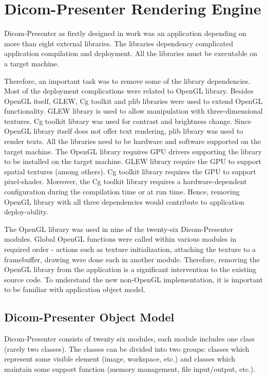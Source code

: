 \chapter{Dicom-Presenter Rendering Engine}
\label{noOpenGL}
\vspace{-10mm}
Dicom-Presenter as firstly designed in work \cite{neskudla} was an application depending on more than
 eight external libraries. The libraries dependency complicated application compilation and deployment. All the libraries must be executable on a target machine.

Therefore, an important task was to remove some of the library dependencies. Most of the deployment complications were related to OpenGL library. Besides OpenGL itself, GLEW, Cg toolkit and plib libraries were used to extend OpenGL functionality. GLEW library is used to allow manipulation with three-dimensional textures. Cg toolkit library was used for contrast and brightness change. Since OpenGL library itself does not offer text rendering, plib library was used to render texts. All the libraries need to be hardware and software supported on the target machine. The OpenGL library requires GPU drivers supporting the library to be installed on the target machine\cite[page 715]{OpenGLhardwaresupport}. GLEW library require the GPU to support spatial textures (among others). Cg toolkit library requires the GPU to support pixel-shader\cite[page~5]{cgtoolkitsupport}. Moreover, the Cg toolkit library requires a hardware-dependent configuration during the compilation time or at run time. Hence, removing OpenGL library with all three dependencies would contribute to application deploy-ability.

The OpenGL library was used in nine of the twenty-six Dicom-Presenter modules. Global OpenGL functions were called within various modules in required order - actions such as texture initialization, attaching the texture to a framebuffer, drawing were done each in another module. Therefore, removing the OpenGL library from the application is a significant intervention to the existing source code. To understand the new non-OpenGL implementation, it is important to be familiar with application object model.

\section{Dicom-Presenter Object Model}
\label{dpobjectmodel}
Dicom-Presenter consists of twenty six modules, each module includes one class (rarely two classes). The classes can be divided into two groups: classes which represent some visible element (image, workspace, etc.) and classes which maintain some support function (memory management, file input/output, etc.).

